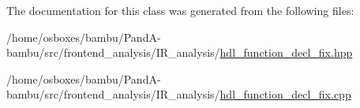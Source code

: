 The documentation for this class was generated from the following files\+:\begin{DoxyCompactItemize}
\item 
/home/osboxes/bambu/\+Pand\+A-\/bambu/src/frontend\+\_\+analysis/\+I\+R\+\_\+analysis/\hyperlink{hdl__function__decl__fix_8hpp}{hdl\+\_\+function\+\_\+decl\+\_\+fix.\+hpp}\item 
/home/osboxes/bambu/\+Pand\+A-\/bambu/src/frontend\+\_\+analysis/\+I\+R\+\_\+analysis/\hyperlink{hdl__function__decl__fix_8cpp}{hdl\+\_\+function\+\_\+decl\+\_\+fix.\+cpp}\end{DoxyCompactItemize}
